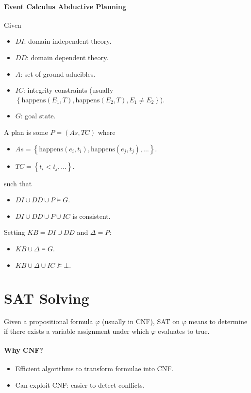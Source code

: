 \documentclass[twocolumn,english]{article}
\begin{document}
\paragraph{Event Calculus Abductive Planning}

Given 
\begin{itemize}
\item $DI$: domain independent theory. 
\item $DD$: domain dependent theory. 
\item $A$: set of ground aducibles.
\item $IC$: integrity constraints (usually $\left\{ \text{happens}\left(E_{1},T\right),\text{happens}\left(E_{2},T\right),E_{1}\neq E_{2}\right\} $). 
\item $G$: goal state. 
\end{itemize}
A plan is some $P=\left(As,TC\right)$ where 
\begin{itemize}
\item $As=\left\{ \text{happens}\left(e_{i},t_{i}\right),\text{happens}\left(e_{j},t_{j}\right),\dots\right\} $. 
\item $TC=\left\{ t_{i}<t_{j},\dots\right\} $. 
\end{itemize}
such that 
\begin{itemize}
\item $DI\cup DD\cup P\vDash G$. 
\item $DI\cup DD\cup P\cup IC$ is consistent. 
\end{itemize}
Setting $KB=DI\cup DD$ and $\Delta=P$: 
\begin{itemize}
\item $KB\cup\Delta\vDash G$. 
\item $KB\cup\Delta\cup IC\not\vDash\bot$. 
\end{itemize}

\section{SAT Solving}

Given a propositional formula $\varphi$ (usually in CNF), SAT on
$\varphi$ means to determine if there exists a variable assignment
under which $\varphi$ evaluates to true.

\paragraph{Why CNF?}
\begin{itemize}
\item Efficient algorithms to transform formulae into CNF. 
\item Can exploit CNF: easier to detect conflicts. 
\end{itemize}
\end{document}
